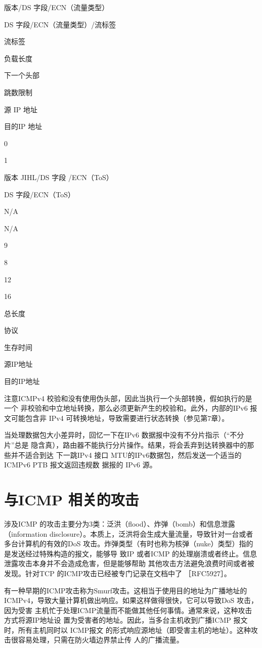 版本/DS 字段/ECN（流量类型）

DS 字段/ECN（流量类型）/流标签

流标签

负载长度

下一个头部

跳数限制

源 IP 地址

目的IP 地址

0

1

版本 JIHL/DS 字段 /ECN（ToS）

DS 字段/ECN（ToS）

N/A

N/A

9

8

12

16

总长度

协议

生存时间

源IP地址

目的IP地址

注意ICMPv4 校验和没有使用伪头部，因此当执行一个头部转换，假如执行的是一个
非校验和中立地址转换，那么必须更新产生的校验和。此外，内部的IPv6 报文可能包含非
IPv4 可转换地址，导致需要进行状态转换（参见第7章）。

当处理数据包大小差异时，回忆一下在IPv6 数据报中没有不分片指示（“不分片”总是
隐含真），路由器不能执行分片操作。结果，将会丢弃到达转换器中的那些并不适合到达
下一跳IPv4 接口 MTU的IPv6数据包，然后发送一个适当的ICMPv6 PTB 报文返回违规数
据报的 IPv6 源。

\section{与ICMP 相关的攻击}

涉及ICMP 的攻击主要分为3类：泛洪（flood）、炸弹（bomb）和信息泄露 （information
disclosure）。本质上，泛洪将会生成大量流量，导致针对一台或者多台计算机的有效的DoS
攻击。炸弹类型（有时也称为核弹（nuke）类型）指的是发送经过特殊构造的报文，能够导
致IP 或者ICMP 的处理崩溃或者终止。信息泄露攻击本身并不会造成危害，但是能够帮助
其他攻击方法避免浪费时间或者被发现。针对TCP 的ICMP攻击已经被专门记录在文档中了
［RFC5927］。

有一种早期的ICMP攻击称为Smurf攻击。这相当于使用目的地址为广播地址的
ICMPv4，导致大量计算机做出响应。如果这样做得很快，它可以导致DoS 攻击，因为受害
主机忙于处理ICMP流量而不能做其他任何事情。通常来说，这种攻击方式将源IP地址设
置为受害者的地址。因此，当多台主机收到广播ICMP 报文时，所有主机同时以 ICMP报文
的形式响应源地址（即受害主机的地址）。这种攻击很容易处理，只需在防火墙边界禁止传
人的广播流量。

